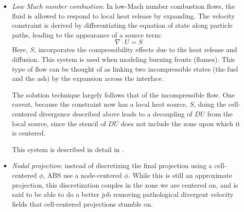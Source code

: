 \begin{itemize}
\item {\em Low Mach number combustion}: In low-Mach number combustion
  flows, the fluid is allowed to respond to local heat release 
  by expanding.  The velocity constraint is derived by differentiating
  the equation of state along particle paths, leading to the appearance
  of a source term:
  \begin{equation}
  \nabla \cdot U = S
  \end{equation}
  Here, $S$, incorporates the compressibility effects due to the 
  heat release and diffusion.  This system is used when modeling
  burning fronts (flames).  This type of flow can be thought
  of as linking two incompressible states (the fuel and the ash)
  by the expansion across the interface.

  The solution technique largely follows that of the incompressible
  flow.  One caveat, because the constraint now has a local heat
  source, $S$, doing the cell-centered divergence described above
  leads to a decoupling of $DU$ from the local source, since the
  stencil of $DU$ does not include the zone upon which it is centered.

  This system is described in detail in \cite{pember-flame,
    DayBell:2000,SNpaper}.

\item {\em Nodal projection}: instead of discretizing the final projection
  using a cell-centered $\phi$, ABS use a node-centered $\phi$.  While
  this is still an approximate projection, this discretization couples
  in the zone we are centered on, and is said to be able to do a better
  job removing pathological divergent velocity fields that cell-centered
  projections stumble on.

\end{itemize}


